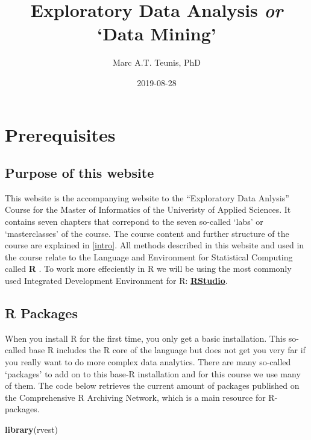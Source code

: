 \documentclass[]{book}
\title{Exploratory Data Analysis \emph{or} `Data Mining'}
\author{Marc A.T. Teunis, PhD}
\date{2019-08-28}
\newenvironment{Shaded}{\begin{snugshade}}{\end{snugshade}}
\newcommand{\KeywordTok}[1]{\textcolor[rgb]{0.13,0.29,0.53}{\textbf{#1}}}
\newcommand{\NormalTok}[1]{#1}
\begin{document}
\maketitle

{
\setcounter{tocdepth}{1}
\tableofcontents
}
\hypertarget{prerequisites}{%
\chapter{Prerequisites}\label{prerequisites}}

\hypertarget{purpose-of-this-website}{%
\section{Purpose of this website}\label{purpose-of-this-website}}

This website is the accompanying website to the ``Exploratory Data Anlysis'' Course for the Master of Informatics of the Univeristy of Applied Sciences. It contains seven chapters that correpond to the seven so-called `labs' or `masterclasses' of the course. The course content and further structure of the course are explained in \ref{intro}. All methods described in this website and used in the course relate to the Language and Environment for Statistical Computing called \textbf{R} \citep{R-base}. To work more effeciently in R we will be using the most commonly used Integrated Development Environment for R: \href{https://www.rstudio.com}{\textbf{RStudio}}\citep{R-rstudio}.

\hypertarget{r-packages}{%
\section{R Packages}\label{r-packages}}

When you install R for the first time, you only get a basic installation. This so-called base R includes the R core of the language but does not get you very far if you really want to do more complex data analytics. There are many so-called `packages' to add on to this base-R installation and for this course we use many of them. The code below retrieves the current amount of packages published on the Comprehensive R Archiving Network, which is a main resource for R-packages.

\begin{Shaded}
\begin{Highlighting}[]
\KeywordTok{library}\NormalTok{(rvest)}
\end{Highlighting}
\end{Shaded}
\end{document}
